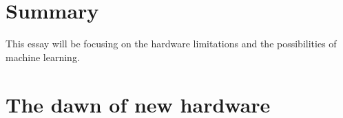 \documentclass{article}
\begin{document}

\section{Summary} %
    This essay will be focusing on the hardware limitations
    and the possibilities of machine learning.


%
%   
%           
%      
%           
%
%
%
%   
%
%
%
%
%
%
%
%
%



\section{The dawn of new hardware}
\end{document}
